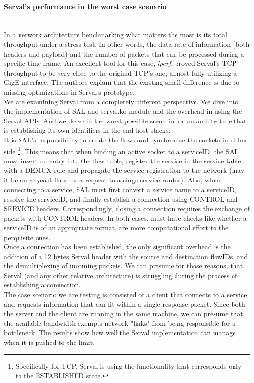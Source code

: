 \paragraph{Serval's performance in the worst case scenario} \hfill \\
In a network architecture benchmarking what matters the most is its total throughput under a stress test.
In other words, the data rate of information (both headers and payload) and the number of packets that can be processed during a specific time frame.
An excellent tool for this case, \emph{iperf}, proved Serval's TCP throughput to be very close to the original TCP's one, almost fully utilizing a GigE interface. 
The authors explain that the existing small difference is due to missing optimizations in Serval's prototype.
\\ \indent We are examining Serval from a completely different perspective.
We dive into the implementation of SAL and serval.ko module and the overhead in using the Serval APIs.
And we do so in the worst possible scenario for an architecture that is establishing its own identifiers in the end host stacks.
\\ \indent It is SAL's responsibility to create the flows and synchronize the sockets in either side \footnote{Specifically for TCP, Serval is using the functionality that corresponds only to the ESTABLISHED state.}.
This means that when binding an active socket to a serviceID, the SAL must insert an entry into the flow table, register the service in the service table with a DEMUX rule and propagate the service registration to the network (may it be an anycast flood or a request to a singe service router).
Also, when connecting to a service, SAL must first convert a service name to a serviceID, resolve the serviceID, and finally establish a connection using CONTROL and SERVICE headers.
Correspondingly, closing a connection requires the exchange of packets with CONTROL headers.
In both cases, must-have checks like whether a serviceID is of an appropriate format, are more computational effort to the perquisite ones.
\\ \indent Once a connection has been established, the only significant overhead is the addition of a 12 bytes Serval header with the source and destination flowIDs, and the demultiplexing of incoming packets.
We can presume for those reasons, that Serval (and any other relative architecture) is struggling during the process of establishing a connection.
\\ \indent The case scenario we are testing is consisted of a client that connects to a service and requests information that can fit within a single response packet.
Since both the server and the client are running in the same machine, we can presume that the available bandwidth exempts network "links" from being responsible for a bottleneck.
The results show how well the Serval implementation can manage when it is pushed to the limit.

